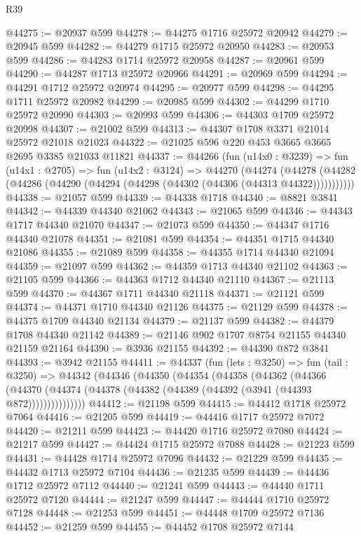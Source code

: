 \begin{lexlean}{R39}
\begin{coremodule}
@44275 := @20937 @599
@44278 := @44275 @1716 @25972 @20942
@44279 := @20945 @599
@44282 := @44279 @1715 @25972 @20950
@44283 := @20953 @599
@44286 := @44283 @1714 @25972 @20958
@44287 := @20961 @599
@44290 := @44287 @1713 @25972 @20966
@44291 := @20969 @599
@44294 := @44291 @1712 @25972 @20974
@44295 := @20977 @599
@44298 := @44295 @1711 @25972 @20982
@44299 := @20985 @599
@44302 := @44299 @1710 @25972 @20990
@44303 := @20993 @599
@44306 := @44303 @1709 @25972 @20998
@44307 := @21002 @599
@44313 := @44307 @1708 @3371 @21014 @25972 @21018 @21023
@44322 := @21025 @596 @220 @453 @3665 @3665 @2695 @3385 @21033 @11821
@44337 := @44266
    (fun (u14x0 : @3239) =>
    fun (u14x1 : @2705) =>
    fun (u14x2 : @3124) =>
    @44270
      (@44274
        (@44278 (@44282 (@44286 (@44290 (@44294 (@44298 (@44302 (@44306 (@44313 @44322)))))))))))
@44338 := @21057 @599
@44339 := @44338 @1718
@44340 := @8821 @3841
@44342 := @44339 @44340 @21062
@44343 := @21065 @599
@44346 := @44343 @1717 @44340 @21070
@44347 := @21073 @599
@44350 := @44347 @1716 @44340 @21078
@44351 := @21081 @599
@44354 := @44351 @1715 @44340 @21086
@44355 := @21089 @599
@44358 := @44355 @1714 @44340 @21094
@44359 := @21097 @599
@44362 := @44359 @1713 @44340 @21102
@44363 := @21105 @599
@44366 := @44363 @1712 @44340 @21110
@44367 := @21113 @599
@44370 := @44367 @1711 @44340 @21118
@44371 := @21121 @599
@44374 := @44371 @1710 @44340 @21126
@44375 := @21129 @599
@44378 := @44375 @1709 @44340 @21134
@44379 := @21137 @599
@44382 := @44379 @1708 @44340 @21142
@44389 := @21146 @902 @1707 @8754 @21155 @44340 @21159 @21164
@44390 := @3936 @21155
@44392 := @44390 @872 @3841
@44393 := @3942 @21155
@44411 := @44337
    (fun (lets : @3250) =>
    fun (tail : @3250) =>
    @44342
      (@44346
        (@44350
          (@44354
            (@44358
              (@44362
                (@44366
                  (@44370 (@44374 (@44378 (@44382 (@44389 (@44392 (@3941 (@44393 @872)))))))))))))))
@44412 := @21198 @599
@44415 := @44412 @1718 @25972 @7064
@44416 := @21205 @599
@44419 := @44416 @1717 @25972 @7072
@44420 := @21211 @599
@44423 := @44420 @1716 @25972 @7080
@44424 := @21217 @599
@44427 := @44424 @1715 @25972 @7088
@44428 := @21223 @599
@44431 := @44428 @1714 @25972 @7096
@44432 := @21229 @599
@44435 := @44432 @1713 @25972 @7104
@44436 := @21235 @599
@44439 := @44436 @1712 @25972 @7112
@44440 := @21241 @599
@44443 := @44440 @1711 @25972 @7120
@44444 := @21247 @599
@44447 := @44444 @1710 @25972 @7128
@44448 := @21253 @599
@44451 := @44448 @1709 @25972 @7136
@44452 := @21259 @599
@44455 := @44452 @1708 @25972 @7144

\end{coremodule}
\end{lexlean}
